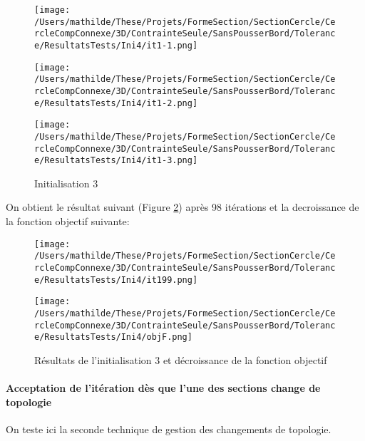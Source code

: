 \documentclass[11pt,a4paper]{article}
\begin{document}
\begin{figure}[H]
	\label{fig:cercleseul3Dini3}
	\begin{minipage}{0.32\textwidth}
		\centering
		\texttt{[image: /Users/mathilde/These/Projets/FormeSection/SectionCercle/CercleCompConnexe/3D/ContrainteSeule/SansPousserBord/Tolerance/ResultatsTests/Ini4/it1-1.png]}
	\end{minipage}
	\begin{minipage}{0.32\textwidth}
		\centering
		\texttt{[image: /Users/mathilde/These/Projets/FormeSection/SectionCercle/CercleCompConnexe/3D/ContrainteSeule/SansPousserBord/Tolerance/ResultatsTests/Ini4/it1-2.png]}
	\end{minipage}
	\begin{minipage}{0.32\textwidth}
		\centering
		\texttt{[image: /Users/mathilde/These/Projets/FormeSection/SectionCercle/CercleCompConnexe/3D/ContrainteSeule/SansPousserBord/Tolerance/ResultatsTests/Ini4/it1-3.png]}
	\end{minipage}	
	\caption{Initialisation 3}	
\end{figure}

On obtient le résultat suivant (Figure \ref{fig:cercleseul3Dini3Fin}) après 98 itérations et la decroissance de la fonction objectif suivante:

\begin{figure}[H]
	\label{fig:cercleseul3Dini3Fin}
	\begin{minipage}{0.45\textwidth}
		\centering
		\texttt{[image: /Users/mathilde/These/Projets/FormeSection/SectionCercle/CercleCompConnexe/3D/ContrainteSeule/SansPousserBord/Tolerance/ResultatsTests/Ini4/it199.png]}
	\end{minipage}	
	\begin{minipage}{0.45\textwidth}
		\centering
		\texttt{[image: /Users/mathilde/These/Projets/FormeSection/SectionCercle/CercleCompConnexe/3D/ContrainteSeule/SansPousserBord/Tolerance/ResultatsTests/Ini4/objF.png]}
	\end{minipage}	
	\caption{Résultats de l'initialisation 3 et décroissance de la fonction objectif}	
\end{figure}



\paragraph{Acceptation de l'itération dès que l'une des sections change de topologie}
On teste ici la seconde technique de gestion des changements de topologie.
\end{document}
